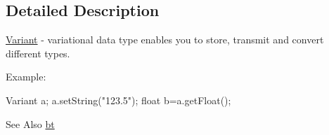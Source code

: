 \subsection{Detailed Description}
\hyperlink{classbt_1_1_variant}{Variant} -\/ variational data type enables you to store, transmit and convert different types. 

Example\-: \begin{DoxyVerb}  Variant a;
  a.setString("123.5");
  float b=a.getFloat();
\end{DoxyVerb}


\begin{DoxySeeAlso}{See Also}
\hyperlink{namespacebt}{bt} 
\end{DoxySeeAlso}

